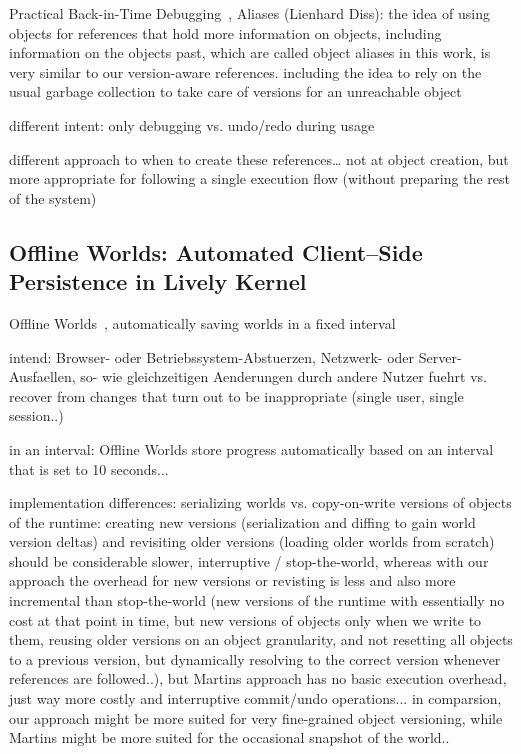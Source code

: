 Practical Back-in-Time Debugging~\cite{Lienhard2008POB}, Aliases (Lienhard Diss): the idea of using objects for references that hold more information on objects, including information on the objects past, which are called object aliases in this work, is very similar to our version-aware references. including the idea to rely on the usual garbage collection to take care of versions for an unreachable object

different intent: only debugging vs. undo/redo during usage

different approach to when to create these references… not at object creation, but more appropriate for following a single execution flow (without preparing the rest of the system)


\subsection{Offline Worlds: Automated Client–Side Persistence in Lively Kernel}
Offline Worlds~\cite{Czuchra2012OfW}, automatically saving worlds in a fixed interval

intend: Browser- oder Betriebssystem-Abstuerzen, Netzwerk- oder Server-Ausfaellen, so- wie gleichzeitigen Aenderungen durch andere Nutzer fuehrt
vs. recover from changes that turn out to be inappropriate (single user, single session..)

in an interval: Offline Worlds store progress automatically based on an interval that is set to 10 seconds...

implementation differences: serializing worlds vs. copy-on-write versions of objects of the runtime: creating new versions (serialization and diffing to gain world version deltas) and revisiting older versions (loading older worlds from scratch) should be considerable slower, interruptive / stop-the-world, whereas with our approach the overhead for new versions or revisting is less and also more incremental than stop-the-world (new versions of the runtime with essentially no cost at that point in time, but new versions of objects only when we write to them, reusing older versions on an object granularity, and not resetting all objects to a previous version, but dynamically resolving to the correct version whenever references are followed..), but Martins approach has no basic execution overhead, just way more costly and interruptive commit/undo operations... in comparsion, our approach might be more suited for very fine-grained object versioning, while Martins might be more suited for the occasional snapshot of the world..


